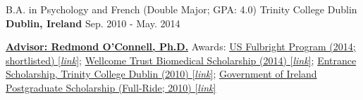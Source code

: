 \begin{cventries}
  \cventry
    {B.A. in Psychology and French (Double Major; GPA: 4.0)} %
    {Trinity College Dublin} %
    {\textbf{Dublin, Ireland}} %
    {Sep. 2010 - May. 2014} %
    {
      \begin{cvitems} %
        \item {{\href{https://oconnell-lab.com/home/meet-the-team/redmond-oconnell/}{\textbf{Advisor: Redmond O'Connell, Ph.D.}}} Awards:  \href{https://www.fulbright.ie/going-to-the-usa/fulbright-irish-scholar-awards/}{US Fulbright Program (2014; shortlisted) [\textit{link}]}; \href{https://wellcome.org/}{ Wellcome Trust Biomedical Scholarship (2014) [\textit{link}]};  \href{https://www.tcd.ie/study/undergraduate/entrance-exhibition/}{Entrance Scholarship, Trinity College Dublin (2010) [\textit{link}]}; \href{https://www.gov.ie/en/service/third-level-scholarships/}{Government of Ireland Postgraduate Scholarship (Full-Ride; 2010) [\textit{link}]}}
      \end{cvitems}
    }

\end{cventries}
